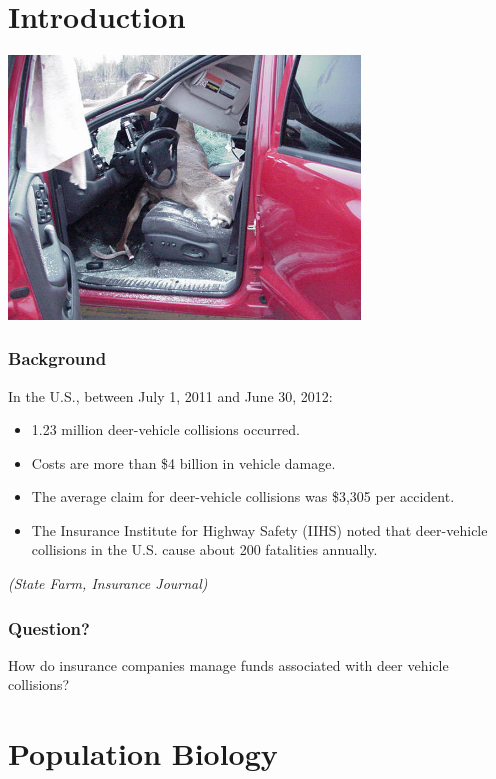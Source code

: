 
\section{Introduction}

\begin{frame}
 	\begin{center}
 	\includegraphics[height=7cm]{DeervsDurango}
 	\end{center}
\end{frame}

\begin{frame}
    \frametitle{Background}
In the U.S., between July 1, 2011 and June 30, 2012:
    \begin{itemize}
    	\item 1.23 million deer-vehicle collisions occurred.
    	\item Costs are more than \$4 billion in vehicle damage.
    	\item The average claim for deer-vehicle collisions was \$3,305 per accident.
    	\item The Insurance Institute for Highway Safety (IIHS) noted that deer-vehicle collisions in the U.S. cause about 200 fatalities annually.
    \end{itemize}
\emph{(State Farm, Insurance Journal)}
\end{frame}


\begin{frame}
    \frametitle{Question?}
How do insurance companies manage funds associated with deer vehicle collisions?
\end{frame}


\section{Population Biology}

